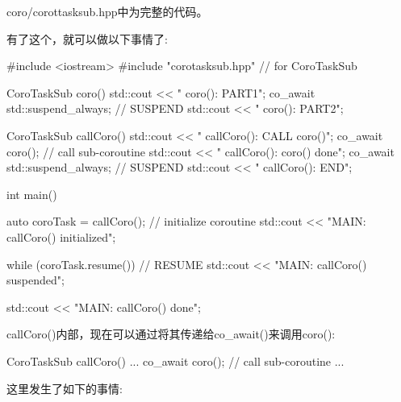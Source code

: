 coro/corottasksub.hpp中为完整的代码。

有了这个，就可以做以下事情了:


\begin{cpp}
#include <iostream>
#include "corotasksub.hpp" // for CoroTaskSub

CoroTaskSub coro()
{
	std::cout << " coro(): PART1\n";
	co_await std::suspend_always{}; // SUSPEND
	std::cout << " coro(): PART2\n";
}

CoroTaskSub callCoro()
{
	std::cout << " callCoro(): CALL coro()\n";
	co_await coro(); // call sub-coroutine
	std::cout << " callCoro(): coro() done\n";
	co_await std::suspend_always{}; // SUSPEND
	std::cout << " callCoro(): END\n";
}

int main()
{
	auto coroTask = callCoro(); // initialize coroutine
	std::cout << "MAIN: callCoro() initialized\n";
	
	while (coroTask.resume()) { // RESUME
		std::cout << "MAIN: callCoro() suspended\n";
	}
	
	std::cout << "MAIN: callCoro() done\n";
}
\end{cpp}

callCoro()内部，现在可以通过将其传递给co\_await()来调用coro():

\begin{cpp}
CoroTaskSub callCoro()
{
	...
	co_await coro(); // call sub-coroutine
	...
}
\end{cpp}

这里发生了如下的事情:


